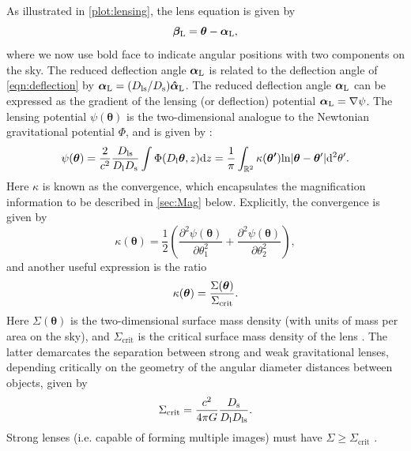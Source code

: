 As illustrated in \autoref{plot:lensing}, the lens equation is given by 
\begin{equation}
\bm{\beta}_{\rm L} = \bm{\theta} - \bm{\alpha}_{\rm L},
\end{equation}
where we now use bold face to indicate angular positions with two components on the sky. The reduced deflection angle $\bm{\alpha}_{\rm L}$ is related to the deflection angle of \autoref{eqn:deflection} by $\bm{\alpha}_{\rm L} = (D_{\rm ls}/D_{\rm s})\bm{\hat{\alpha}}_{\rm L}$. The reduced deflection angle $\bm{\alpha}_{\rm L}$ can be expressed as the gradient of the lensing (or deflection) potential $\bm{\alpha}_{\rm L} = \nabla \psi$. The lensing potential $\psi(\bm{\theta})$ is the two-dimensional analogue to the Newtonian gravitational potential $\Phi$, and is given by \citep{NarayanBartelmann96}:
\begin{equation}
\psi(\bm{\theta}) = \frac{2}{c^2}\frac{D_{\rm ls}}{D_{\rm l} D_{\rm s}} \int \Phi(D_{\rm l} \bm{\theta},z){\rm d}z = \frac{1}{\pi} \int_{\mathbb{R}^2} \kappa(\bm{\theta'}) {\rm ln}|\bm{\theta} - \bm{\theta}'| {\rm d}^2 \theta'.
\end{equation}
Here $\kappa$ is known as the convergence, which encapsulates the magnification information to be described in \autoref{sec:Mag} below. Explicitly, the convergence is given by
\begin{equation}
\label{eqn:kappapartials}
\kappa(\bm{\theta}) =\frac{1}{2} \left( \frac{\partial^2 \psi(\bm{\theta})}{\partial\theta_1^2} + \frac{\partial^2 \psi(\bm{\theta})}{\partial\theta_2^2} \right),
\end{equation}
and another useful expression is the ratio
\begin{equation}
\label{eqn:kappa}
\kappa(\bm{\theta}) = \frac{\Sigma(\bm{\theta})}{\Sigma_{\rm crit}}.
\end{equation}
Here $\Sigma(\bm{\theta})$ is the two-dimensional surface mass density (with units of mass per area on the sky), and $\Sigma_{\mathrm{crit}}$ is the critical surface mass density of the lens \citep{Wright00}. The latter demarcates the separation between strong and weak gravitational lenses, depending critically on the geometry of the angular diameter distances between objects, given by
\begin{equation}
\label{eqn:sigcrit}
\Sigma_{\mathrm{crit}} = \frac{c^2}{4 \pi G} \frac{D_{\rm s}}{D_{\rm l} D_{\rm ls}}.
\end{equation}
Strong lenses (i.e. capable of forming multiple images) must have $\Sigma \ge \Sigma_{\mathrm{crit}}$ \citep{Schneider06_IntroGravLensCosmology}.

